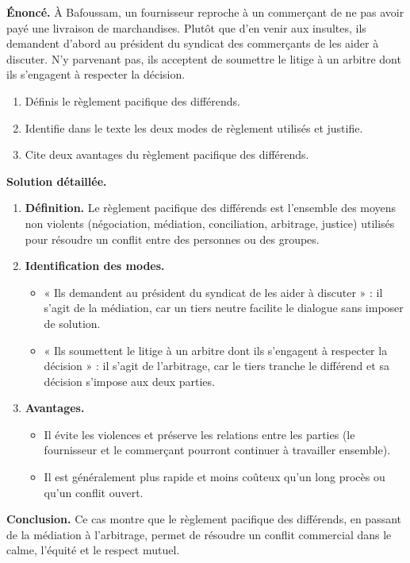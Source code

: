 \documentclass[11pt]{article}
\newcommand{\cle}[1]{{\popxbold\color{popdark}#1}}
\begin{document}
\begin{exoresolu}
\textbf{Énoncé.} À Bafoussam, un fournisseur reproche à un commerçant de ne pas avoir payé une livraison de marchandises. Plutôt que d'en venir aux insultes, ils demandent d'abord au président du syndicat des commerçants de les aider à discuter. N'y parvenant pas, ils acceptent de soumettre le litige à un arbitre dont ils s'engagent à respecter la décision.
\begin{enumerate}
\item Définis le règlement pacifique des différends.
\item Identifie dans le texte les deux modes de règlement utilisés et justifie.
\item Cite deux avantages du règlement pacifique des différends.
\end{enumerate}
\tcblower
\textbf{Solution détaillée.}
\begin{enumerate}
\item \textbf{Définition.} Le règlement pacifique des différends est l'ensemble des moyens non violents (négociation, médiation, conciliation, arbitrage, justice) utilisés pour résoudre un conflit entre des personnes ou des groupes.
\item \textbf{Identification des modes.}
\begin{itemize}
\item « Ils demandent au président du syndicat de les aider à discuter » : il s'agit de la \cle{médiation}, car un tiers neutre facilite le dialogue sans imposer de solution.
\item « Ils soumettent le litige à un arbitre dont ils s'engagent à respecter la décision » : il s'agit de l'\cle{arbitrage}, car le tiers tranche le différend et sa décision s'impose aux deux parties.
\end{itemize}
\item \textbf{Avantages.}
\begin{itemize}
\item Il évite les violences et préserve les relations entre les parties (le fournisseur et le commerçant pourront continuer à travailler ensemble).
\item Il est généralement plus rapide et moins coûteux qu'un long procès ou qu'un conflit ouvert.
\end{itemize}
\end{enumerate}
\textbf{Conclusion.} Ce cas montre que le règlement pacifique des différends, en passant de la médiation à l'arbitrage, permet de résoudre un conflit commercial dans le calme, l'équité et le respect mutuel.
\end{exoresolu}
\end{document}
